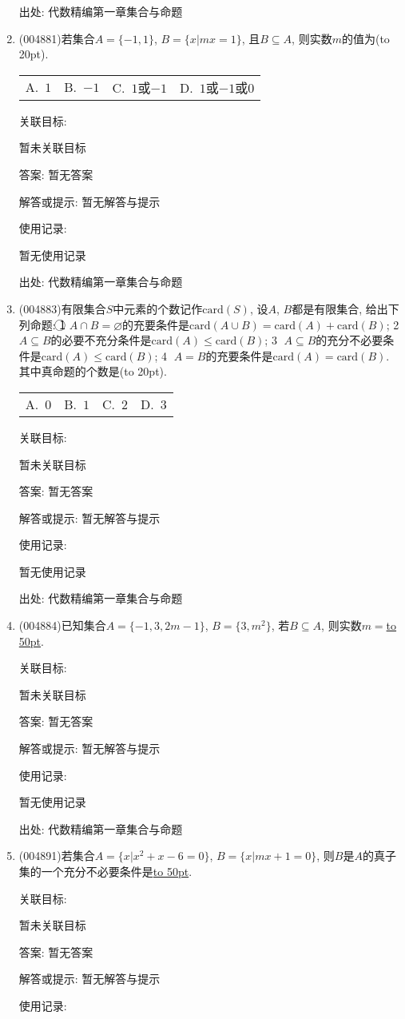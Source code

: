 \documentclass[10pt,a4paper]{article}
\newcommand{\blank}[1]{\underline{\hbox to #1pt{}}}
\newcommand{\bracket}[1]{(\hbox to #1pt{})}
\newcommand{\fourch}[4]{\par\begin{tabular}{p{.23\textwidth}p{.23\textwidth}p{.23\textwidth}p{.23\textwidth}}
A.~#1 &B.~#2& C.~#3& D.~#4
\end{tabular}}
\begin{document}
\begin{enumerate}[1.]
出处: 代数精编第一章集合与命题
\item { (004881)}若集合$A=\{-1,1\}$, $B=\{x|mx=1\}$, 且$B\subseteq A$, 则实数$m$的值为\bracket{20}.
\fourch{$1$}{$-1$}{$1$或$-1$}{$1$或$-1$或$0$}


关联目标:

暂未关联目标

答案: 暂无答案

解答或提示: 暂无解答与提示

使用记录:

暂无使用记录


出处: 代数精编第一章集合与命题
\item { (004883)}有限集合$S$中元素的个数记作$\mathrm{card}(S)$, 设$A$, $B$都是有限集合, 给出下列命题:
\textcircled{1} $A\cap B=\varnothing$的充要条件是$\mathrm{card}(A\cup B)=\mathrm{card}(A)+\mathrm{card}(B)$; \textcircled{2} $A\subseteq B$的必要不充分条件是$\mathrm{card}(A)\le \mathrm{card}(B)$; \textcircled{3} $A\subseteq B$的充分不必要条件是$\mathrm{card}(A)\le \mathrm{card}(B)$; \textcircled{4} $A=B$的充要条件是$\mathrm{card}(A)=\mathrm{card}(B)$. 
其中真命题的个数是\bracket{20}.
\fourch{$0$}{$1$}{$2$}{$3$}


关联目标:

暂未关联目标

答案: 暂无答案

解答或提示: 暂无解答与提示

使用记录:

暂无使用记录


出处: 代数精编第一章集合与命题
\item { (004884)}已知集合$A=\{-1,3,2m-1\}$, $B=\{3,m^2\}$, 若$B\subseteq A$, 则实数$m=$\blank{50}.


关联目标:

暂未关联目标

答案: 暂无答案

解答或提示: 暂无解答与提示

使用记录:

暂无使用记录


出处: 代数精编第一章集合与命题
\item { (004891)}若集合$A=\{x|x^2+x-6=0\}$, $B=\{x|mx+1=0\}$, 则$B$是$A$的真子集的一个充分不必要条件是\blank{50}.


关联目标:

暂未关联目标

答案: 暂无答案

解答或提示: 暂无解答与提示

使用记录:


\end{enumerate}
\end{document}

